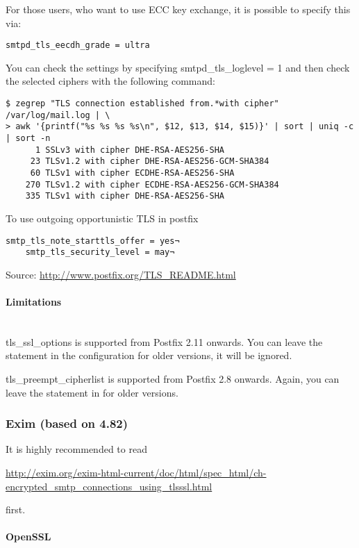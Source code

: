 For those users, who want to use ECC key exchange, it is possible to specify this via:
\begin{lstlisting}[breaklines]
  smtpd_tls_eecdh_grade = ultra
\end{lstlisting}

You can check the settings by specifying  smtpd\_tls\_loglevel = 1 and then check the selected ciphers with the following command:
\begin{lstlisting}[breaklines]
$ zegrep "TLS connection established from.*with cipher" /var/log/mail.log | \
> awk '{printf("%s %s %s %s\n", $12, $13, $14, $15)}' | sort | uniq -c | sort -n
      1 SSLv3 with cipher DHE-RSA-AES256-SHA
     23 TLSv1.2 with cipher DHE-RSA-AES256-GCM-SHA384
     60 TLSv1 with cipher ECDHE-RSA-AES256-SHA
    270 TLSv1.2 with cipher ECDHE-RSA-AES256-GCM-SHA384
    335 TLSv1 with cipher DHE-RSA-AES256-SHA
\end{lstlisting}

To use outgoing opportunistic TLS in postfix

\begin{lstlisting}[breaklines]
    smtp_tls_note_starttls_offer = yes¬
    smtp_tls_security_level = may¬
\end{lstlisting}


Source: \url{http://www.postfix.org/TLS_README.html}

\paragraph*{Limitations}\mbox{}\\

tls\_ssl\_options is supported from Postfix 2.11 onwards. You can
leave the statement in the configuration for older versions, it will
be ignored.

tls\_preempt\_cipherlist is supported from Postfix 2.8 onwards. Again,
you can leave the statement in for older versions.


\subsubsection{Exim (based on 4.82)}

It is highly recommended to read

\url{http://exim.org/exim-html-current/doc/html/spec_html/ch-encrypted_smtp_connections_using_tlsssl.html}

first.

\paragraph*{OpenSSL}

